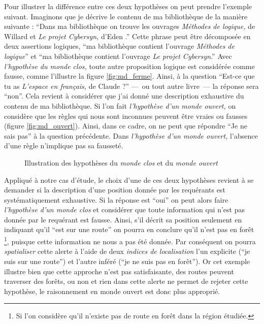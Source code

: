 Pour illustrer la différence entre ces deux hypothèses on peut prendre
l'exemple suivant. Imaginons que je décrive le contenu de ma
bibliothèque de la manière suivante : \enquote{Dans ma bibliothèque on
  trouve les ouvrages \emph{Méthodes de logique,} de Willard
   et \emph{Le projet \emph{Cybersyn},} d'Eden
  .} Cette phrase peut être décomposée en deux assertions
logiques, \enquote{ma bibliothèque contient l'ouvrage \emph{Méthodes
    de logique}} et \enquote{ma bibliothèque contient l'ouvrage
  \emph{Le projet \emph{Cybersyn}}.} Avec \emph{l'hypothèse du monde
  clos,} toute autre proposition logique est considérée comme fausse,
comme l'illustre la figure \ref{fig:md_ferme}. Ainsi, à la question
\enquote{Est-ce que tu as \emph{L'espace en français,} de Claude
   ?} ---~ou tout autre livre~--- la réponse sera
\enquote{non}. Cela revient à considérer que j'ai donné une
description exhaustive du contenu de ma bibliothèque. Si l'on fait
\emph{l'hypothèse d'un monde ouvert,} on considère que les règles qui
nous sont inconnues peuvent être vraies ou fausses (figure
\ref{fig:md_ouvert}). Ainsi, dans ce cadre, on ne peut que répondre
\enquote{Je ne sais pas} à la question précédente. Dans
\emph{l'hypothèse d'un monde ouvert,} l’absence d'une règle n'implique
pas sa fausseté.

\begin{figure}
  \centering
  \subfloat[]{
    
    \label{fig:md_ferme}
  }\hspace{2cm}
  \subfloat[]{
    
    \label{fig:md_ouvert}
  }
  \caption{Illustration des hypothèses du \emph{monde clos}
    \protect{} et du \emph{monde ouvert}
    \protect{}}
  \label{fig:comp_md}
\end{figure}

Appliqué à notre cas d'étude, le choix d'une de ces deux hypothèses
revient à se demander si la description d'une position donnée par les
requérants est systématiquement exhaustive. Si la réponse est
\enquote{oui} on peut alors faire \emph{l'hypothèse d'un monde clos}
et considérer que toute information qui n'est pas donnée par le
requérant est fausse. Ainsi, s'il décrit sa position seulement en
indiquant qu'il \enquote{est sur une route} on pourra en conclure
qu'il n'est pas en forêt \footnote{Si l'on considère qu'il n'existe
  pas de route en forêt dans la région étudiée.}, puisque cette
information ne nous a pas été donnée. Par conséquent on pourra
\emph{spatialiser} cette alerte à l'aide de deux \emph{indices de
  localisation} l'un explicite (\enquote{je suis sur une route}) et
l'autre inféré (\enquote{je ne suis pas en forêt}). Or cet exemple
illustre bien que cette approche n'est pas satisfaisante, des routes
peuvent traverser des forêts, ou non et rien dans cette alerte ne
permet de rejeter cette hypothèse, le raisonnement en monde ouvert est
donc plus approprié.

